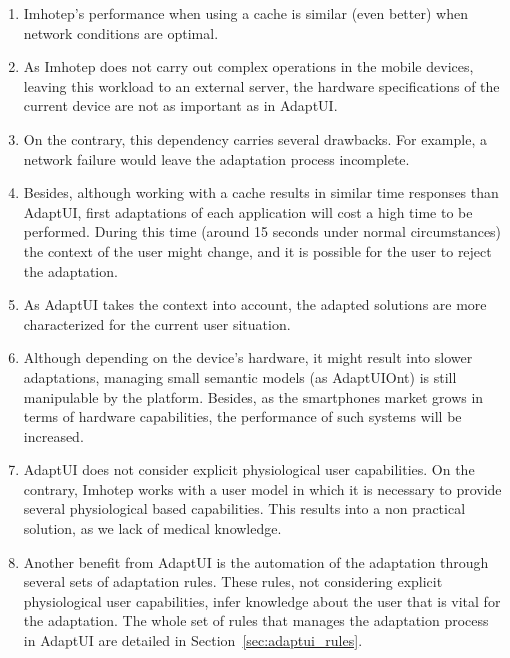 \begin{enumerate}[label=\alph*)]
  \item Imhotep's performance when using a cache is similar (even better) when
  network conditions are optimal. 
  
  \item As Imhotep does not carry out complex operations in the mobile devices,
  leaving this workload to an external server, the hardware specifications of 
  the current device are not as important as in AdaptUI.
  
  \item On the contrary, this dependency carries several drawbacks. For 
  example, a network failure would leave the adaptation process incomplete.
  
  \item Besides, although working with a cache results in similar time responses
  than AdaptUI, first adaptations of each application will cost a high time to
  be performed. During this time (around 15 seconds under normal circumstances)
  the context of the user might change, and it is possible for the user to 
  reject the adaptation.
  
  \item As AdaptUI takes the context into account, the adapted solutions are
  more characterized for the current user situation.
  
  \item Although depending on the device's hardware, it might result into slower
  adaptations, managing small semantic models (as AdaptUIOnt) is still 
  manipulable by the platform. Besides, as the smartphones market grows in terms
  of hardware capabilities, the performance of such systems will be increased.
  
  \item AdaptUI does not consider explicit physiological user capabilities. On 
  the contrary, Imhotep works with a user model in which it is necessary to
  provide several physiological based capabilities. This results into a non
  practical solution, as we lack of medical knowledge.
  
  \item Another benefit from AdaptUI is the automation of the adaptation 
  through several sets of adaptation rules. These rules, not considering 
  explicit physiological user capabilities, infer knowledge about the user that
  is vital for the adaptation. The whole set of rules that manages the adaptation
  process in AdaptUI are detailed in Section~\ref{sec:adaptui_rules}.
\end{enumerate}